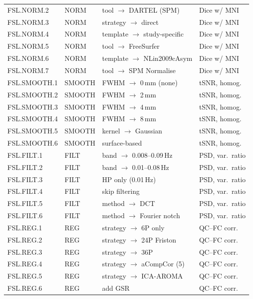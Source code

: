 \documentclass[11pt,a4paper]{article}
\begin{document}
\begin{longtable}{@{}llll@{}}
FSL.NORM.2 & NORM & tool $\to$ DARTEL (SPM)     & Dice w/ MNI \\
FSL.NORM.3 & NORM & strategy $\to$ direct        & Dice w/ MNI \\
FSL.NORM.4 & NORM & template $\to$ study-specific & Dice w/ MNI \\
FSL.NORM.5 & NORM & tool $\to$ FreeSurfer        & Dice w/ MNI \\
FSL.NORM.6 & NORM & template $\to$ NLin2009cAsym & Dice w/ MNI \\
FSL.NORM.7 & NORM & tool $\to$ SPM Normalise     & Dice w/ MNI \\
\midrule
FSL.SMOOTH.1 & SMOOTH & FWHM $\to$ 0\,mm (none)  & tSNR, homog. \\
FSL.SMOOTH.2 & SMOOTH & FWHM $\to$ 2\,mm          & tSNR, homog. \\
FSL.SMOOTH.3 & SMOOTH & FWHM $\to$ 4\,mm          & tSNR, homog. \\
FSL.SMOOTH.4 & SMOOTH & FWHM $\to$ 8\,mm          & tSNR, homog. \\
FSL.SMOOTH.5 & SMOOTH & kernel $\to$ Gaussian      & tSNR, homog. \\
FSL.SMOOTH.6 & SMOOTH & surface-based              & tSNR, homog. \\
\midrule
FSL.FILT.1 & FILT & band $\to$ 0.008--0.09\,Hz   & PSD, var.\ ratio \\
FSL.FILT.2 & FILT & band $\to$ 0.01--0.08\,Hz    & PSD, var.\ ratio \\
FSL.FILT.3 & FILT & HP only (0.01\,Hz)            & PSD, var.\ ratio \\
FSL.FILT.4 & FILT & skip filtering                & PSD, var.\ ratio \\
FSL.FILT.5 & FILT & method $\to$ DCT              & PSD, var.\ ratio \\
FSL.FILT.6 & FILT & method $\to$ Fourier notch    & PSD, var.\ ratio \\
\midrule
FSL.REG.1  & REG & strategy $\to$ 6P only        & QC--FC corr. \\
FSL.REG.2  & REG & strategy $\to$ 24P Friston    & QC--FC corr. \\
FSL.REG.3  & REG & strategy $\to$ 36P            & QC--FC corr. \\
FSL.REG.4  & REG & strategy $\to$ aCompCor (5)   & QC--FC corr. \\
FSL.REG.5  & REG & strategy $\to$ ICA-AROMA      & QC--FC corr. \\
FSL.REG.6  & REG & add GSR                       & QC--FC corr. \\

\end{longtable}
\end{document}
